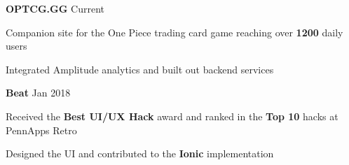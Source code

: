 



\begin{cventries}


\cventry
{\textbf{OPTCG.GG }\href{https://www.optcg.gg}{\faShareSquare}}
{Current} %
{ %
\begin{cvitems}
\item {Companion site for the One Piece trading card game reaching over \textbf{1200} daily users}
\item {Integrated Amplitude analytics and built out backend services}
\end{cvitems}
}





\cventry
{\textbf{Beat }\href{https://devpost.com/software/beat}{\faShareSquare}}
{Jan 2018} %
{ %
\begin{cvitems}
\item {Received the \textbf{Best UI/UX Hack} award and ranked in the \textbf{Top 10} hacks at PennApps Retro}
\item {Designed the UI and contributed to the \textbf{Ionic} implementation}
\end{cvitems}
}


\end{cventries}
